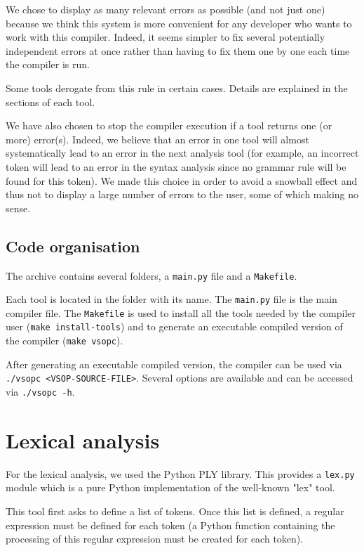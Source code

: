 \documentclass[a4paper, 12pt]{article}
\begin{document}
    We chose to display as many relevant errors as possible (and not just one) because we think this system is more convenient for any developer who wants to work with this compiler. Indeed, it seems simpler to fix several potentially independent errors at once rather than having to fix them one by one each time the compiler is run.
    
    Some tools derogate from this rule in certain cases. Details are explained in the sections of each tool.
    
    We have also chosen to stop the compiler execution if a tool returns one (or more) error(s). Indeed, we believe that an error in one tool will almost systematically lead to an error in the next analysis tool (for example, an incorrect token will lead to an error in the syntax analysis since no grammar rule will be found for this token). We made this choice in order to avoid a snowball effect and thus not to display a large number of errors to the user, some of which making no sense.
    
    \subsection{Code organisation}
    
    The archive contains several folders, a \texttt{main.py} file and a \texttt{Makefile}.
    
    Each tool is located in the folder with its name. The \texttt{main.py} file is the main compiler file. The \texttt{Makefile} is used to install all the tools needed by the compiler user (\texttt{make install-tools}) and to generate an executable compiled version of the compiler (\texttt{make vsopc}).
    
    After generating an executable compiled version, the compiler can be used via \texttt{./vsopc <VSOP-SOURCE-FILE>}. Several options are available and can be accessed via \texttt{./vsopc -h}.
    
    
    \section{Lexical analysis}
    
    For the lexical analysis, we used the Python PLY library. This provides a \texttt{lex.py} module which is a pure Python implementation of the well-known "lex" tool.
    
    This tool first asks to define a list of tokens. Once this list is defined, a regular expression must be defined for each token (a Python function containing the processing of this regular expression must be created for each token).
    
\end{document}

